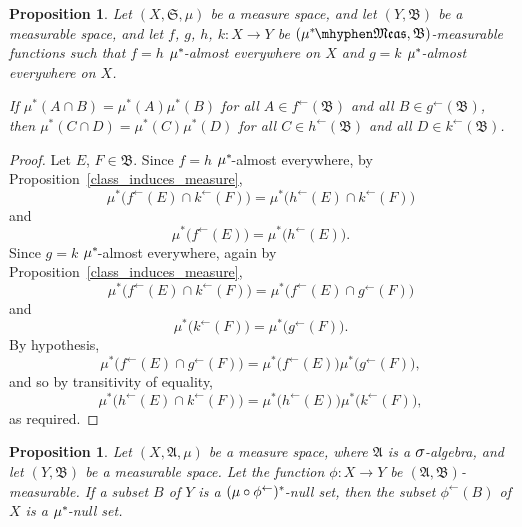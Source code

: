 \documentclass[
twoside=true,
paper=letter,
fontsize=9pt,
pagesize=auto,
leqno,
openany,
headsepline,
overfullrule,
]{scrbook}
\theoremstyle{plain}
\theoremstyle{plain}
\newtheorem{prop}[thm]{Proposition}
\theoremstyle{definition}
\theoremstyle{bfnoteitalic}
\theoremstyle{bfnoteroman}
\newcommand{\sigalg}[1]{\mathfrak{#1}}
\newcommand{\textsigma}{\hbox{\large{$\sigma$}}\kern-1pt}
\newcommand{\preimage}[1]{#1^{\leftarrow}}
\newcommand{\meets}{\cap}
\newcommand{\semiring}{\sigalg{S}}
\newcommand{\sigmaalgebra}{\sigalg{A}}
\newcommand{\sigmaalgebraii}{\sigalg{B}}
\newcommand{\measurable}[1]{{#1}\mhyphen\mathfrak{Meas}}
\newcommand{\kernast}{\ast\kern-1pt}
\newcommand{\measurespace}{X}
\newcommand{\measurespaceii}{Y}
\newcommand{\measure}{\mu}
\begin{document}
\begin{prop}\label{class_induced_measure}
Let $(\measurespace,\semiring,\measure)$ be a measure space, and let $(\measurespaceii, \sigmaalgebraii)$ be a measurable space, and let
$f$, $g$, $h$, $k:\measurespace\to\measurespaceii$ 
be $(\measurable{\measure^\kernast}, \sigmaalgebraii)$\hyp{}measurable functions such that 
$f = h$ $\measure^\kernast$-almost everywhere on $\measurespace$ and
$g = k$ $\measure^\kernast$-almost everywhere on $\measurespace$.

If $\measure^*(A\meets B) =\measure^*(A)\measure^*(B)$ for all $A\in\preimage{f}(\sigmaalgebraii)$ and 
all $B\in\preimage{g}(\sigmaalgebraii)$, then
$\measure^*(C\meets D) =\measure^*(C)\measure^*(D)$ for all $C\in\preimage{h}(\sigmaalgebraii)$ and 
all $D\in\preimage{k}(\sigmaalgebraii)$.
\end{prop}

\begin{proof}
Let $E$, $F\in\sigmaalgebraii$.
Since $f=h$ $\measure^\kernast$-almost everywhere, 
by Proposition~\ref{class_induces_measure},
\[
\measure^*\bigl(\preimage{f}(E)\meets\preimage{k}(F)\bigr) 
= 
\measure^*\bigl(\preimage{h}(E)\meets\preimage{k}(F)\bigr)
\]
and
\[
\measure^*\bigl(\preimage{f}(E)\bigr) 
= 
\measure^*\bigl(\preimage{h}(E)\bigr).
\]
Since $g=k$ $\measure^\kernast$-almost everywhere, again
by Proposition~\ref{class_induces_measure},
\[
\measure^*\bigl(\preimage{f}(E)\meets\preimage{k}(F)\bigr) 
= 
\measure^*\bigl(\preimage{f}(E)\meets\preimage{g}(F)\bigr)
\]
and
\[
\measure^*\bigl(\preimage{k}(F)\bigr) 
= 
\measure^*\bigl(\preimage{g}(F)\bigr).
\]
By hypothesis,
\[
\measure^*\bigl(\preimage{f}(E)\meets\preimage{g}(F)\bigr)
=
\measure^*\bigl(\preimage{f}(E)\bigr)\measure^*\bigl(\preimage{g}(F)\bigr),
\]
and so by transitivity of equality,
\[
\measure^*\bigl(\preimage{h}(E)\meets\preimage{k}(F)\bigr)
=
\measure^*\bigl(\preimage{h}(E)\bigr)\measure^*\bigl(\preimage{k}(F)\bigr),
\]
as required.
\end{proof}


\begin{prop}\label{preimage_of_a_null_set}
Let $(\measurespace,\sigmaalgebra,\measure)$ be a measure space, where $\sigmaalgebra$ is a $\textsigma$-algebra, and let $(\measurespaceii, \sigmaalgebraii)$ be a measurable space.  Let the function $\phi:\measurespace\to\measurespaceii$ be $(\sigmaalgebra, \sigmaalgebraii)$\hyp{}measurable.
If a subset $B$ of $\measurespaceii$ is a $(\measure\circ\preimage{\phi})^\kernast$-null set, then  the subset $\preimage{\phi}(B)$ of $\measurespace$ is a $\measure^\kernast$-null set.
\end{prop}
\end{document}
